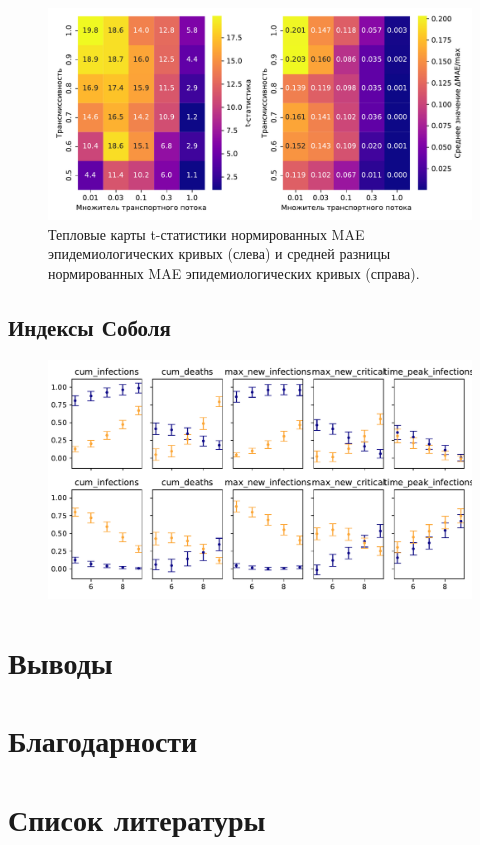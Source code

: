 \documentclass[a4paper,12pt]{article} %
\begin{document}
\begin{figure}[H]
    \centering
    \includegraphics[width=\linewidth]{images/diffsatellites_heatmaps.pdf}
    \caption{Тепловые карты t-статистики нормированных MAE эпидемиологических кривых (слева) и средней разницы нормированных MAE эпидемиологических кривых (справа).}
    \label{pic:diffsatellites_heatmaps}
\end{figure}






\subsection{Индексы Соболя}

\begin{figure}[H]
    \centering
    \includegraphics[width=\linewidth]{images/flow_to_small_S1_index.pdf}
    \caption{}
\end{figure}

\section{Выводы}
\section{Благодарности}
\section{Список литературы}


\printbibliography
\end{document}
